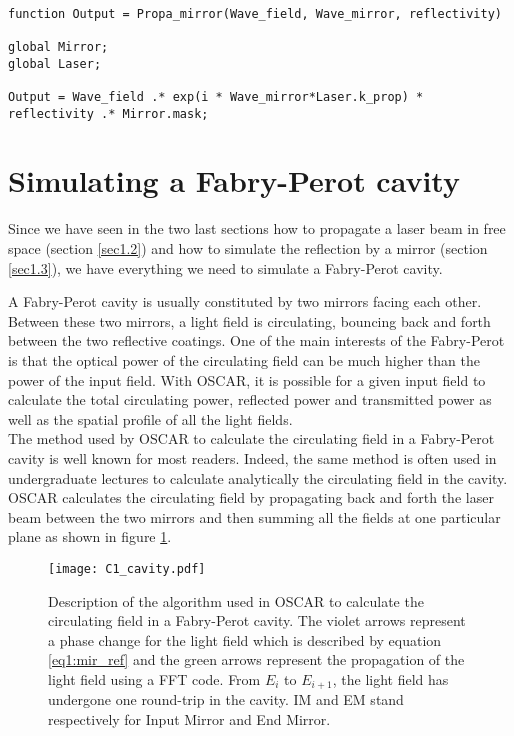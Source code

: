 \begin{lstlisting}[float=htp,caption=The function used to simulate the reflection of an electric field by a mirror\label{lis1:refl1},frame=lines]

function Output = Propa_mirror(Wave_field, Wave_mirror, reflectivity)

global Mirror;
global Laser;

Output = Wave_field .* exp(i * Wave_mirror*Laser.k_prop) * reflectivity .* Mirror.mask;

\end{lstlisting}


\section{Simulating a Fabry-Perot cavity}
\label{sec1.4}

Since we have seen in the two last sections how to propagate a laser beam in free space (section \ref{sec1.2}) and how to simulate the reflection by a mirror (section \ref{sec1.3}), we have everything we need to simulate a Fabry-Perot cavity.

A Fabry-Perot cavity is usually constituted by two mirrors facing each other. Between these two mirrors, a light field is circulating, bouncing back and forth between the two reflective coatings. One of the main interests of the Fabry-Perot is that the optical power of the circulating field can be much higher than the power of the input field. With OSCAR, it is possible for a given input field to calculate the total circulating power, reflected power and transmitted power as well as the spatial profile of all the light fields.\\

The method used by OSCAR to calculate the circulating field in a Fabry-Perot cavity is well known for most readers. Indeed, the same method is often used in undergraduate lectures to calculate analytically the circulating field in the cavity\cite{Cav_circ}. OSCAR calculates the circulating field by propagating back and forth the laser beam between the two mirrors and then summing all the fields at one particular plane as shown in figure \ref{fig1:cavity}.

\begin{figure}
\begin{center}
\texttt{[image: C1\_cavity.pdf]}
\end{center}
\caption{\label{fig1:cavity} Description of the algorithm used in OSCAR to calculate the circulating field in a Fabry-Perot cavity. The violet arrows represent a phase change for the light field which is described by equation \ref{eq1:mir_ref} and the green arrows represent the propagation of the light field using a FFT code. From $E_i$ to $E_{i+1}$, the light field has undergone one round-trip in the cavity. IM and EM stand respectively for Input Mirror and End Mirror.}
\end{figure}


